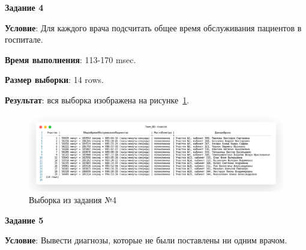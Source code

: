 
\newpage

\begin{center}
  \textbf{Задание 4}
\end{center}
  
\textbf{Условие}:
Для каждого врача подсчитать общее время обслуживания пациентов в госпитале.



\textbf{Время выполнения}: 113-170 msec.

\textbf{Размер выборки}: 14 rows.

\textbf{Результат}: вся выборка изображена на рисунке~\ref{fig:t4}.

\begin{figure}[!h]
  \centering

  \includegraphics[width=18cm]
  {../sql/task4/4-out.png}

  \caption{Выборка из задания №4}

  \label{fig:t4}
\end{figure}


\begin{center}
  \textbf{Задание 5}
\end{center}
  
\textbf{Условие}:
Вывести диагнозы, которые не были поставлены ни одним врачом.
  




